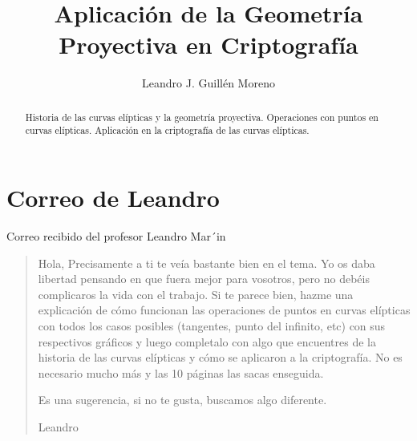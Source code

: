 \documentclass[a4paper,10pt]{article}
\title{Aplicación de la Geometría Proyectiva en Criptografía}
\author{Leandro J. Guillén Moreno}
\begin{document}
\maketitle

\begin{abstract}
Historia de las curvas elípticas y la geometría proyectiva. Operaciones con puntos en curvas elípticas. Aplicación en la criptografía de las curvas elípticas.
\end{abstract}

\section{Correo de Leandro}
Correo recibido del profesor Leandro Mar´in
\begin{quotation}
Hola,
Precisamente a ti te veía bastante bien en el tema. Yo os daba libertad pensando en que fuera mejor para vosotros, pero no debéis complicaros la vida con el trabajo. Si te parece bien, hazme una explicación de cómo funcionan las operaciones de puntos en curvas elípticas con todos los casos posibles (tangentes, punto del infinito, etc) con sus respectivos gráficos y luego completalo con algo que encuentres de la historia de las curvas elípticas y cómo se aplicaron a la criptografía. No es necesario mucho más y las 10 páginas las sacas enseguida.

Es una sugerencia, si no te gusta, buscamos algo diferente.

Leandro
 
\end{quotation}
\end{document}
